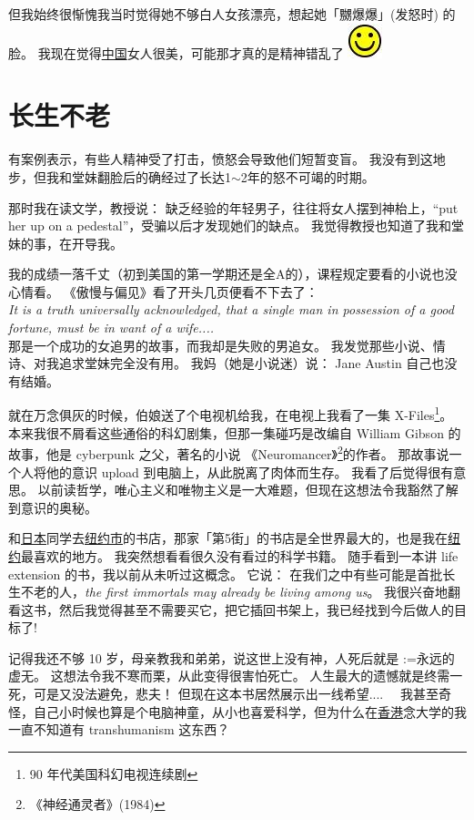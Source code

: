 \documentclass[12pt]{report}
\makeatletter
\renewcommand{\d}[1]{$\underaccent{\scalebox{0.5}{\textbullet}}{\textrm{#1}}$}
\newcommand{\ds}[1]{%
  \@tfor\next:=#1\do{\d{\next}}}
\newcommand*\smiley{\includegraphics[scale=0.5]{smiley.jpg}}
\makeatother
\begin{document}
但我始终很惭愧我当时觉得她不够白人女孩漂亮，想起她「嬲爆爆」(发怒时) 的脸。 我现在觉得\uline{中国}女人很美，可能那才真的是精神错乱了 \smiley

\chapter{长生不老}

有案例表示，有些人精神受了打击，愤怒会导致他们短暂变盲。 我没有到这地步，但我和堂妹翻脸后的确经过了长达1$\sim$2年的怒不可竭的时期。

那时我在读文学，教授说： 缺乏经验的年轻男子，往往将女人摆到神枱上，``put her up on a pedestal''，受骗以后才发现她们的缺点。  我觉得教授也知道了我和堂妹的事，在开导我。

我的成绩一落千丈（初到美国的第一学期还是全A的），课程规定要看的小说也没心情看。 《傲慢与偏见》看了开头几页便看不下去了： \\
\textit{It is a truth universally acknowledged, that a single man in possession of a good fortune, must be in want of a wife....} \\
那是一个成功的女追男的故事，而我却是失败的男追女。 我发觉那些小说、情诗、对我追求堂妹完全没有用。 我妈（她是小说迷）说： Jane Austin 自己也没有结婚。

就在万念俱灰的时候，伯娘送了个电视机给我，在电视上我看了一集 X-Files\footnote{90 年代美国科幻电视连续剧}。 本来我很不屑看这些通俗的科幻剧集，但那一集碰巧是改编自 William Gibson 的故事，他是 cyberpunk 之父，著名的小说 《Neuromancer》\footnote{《神经通灵者》(1984)}的作者。 那故事说一个人将他的意识 upload 到电脑上，从此脱离了肉体而生存。 我看了后觉得很有意思。 以前读哲学，唯心主义和唯物主义是一大难题，但现在这想法令我豁然了解到意识的奥秘。 

和\uline{日本}同学去\uline{纽约市}的书店，那家「第5街」的书店是全世界最大的，也是我在\uline{纽约}最喜欢的地方。 我突然想看看很久没有看过的科学书籍。 随手看到一本讲 life extension 的书，我以前从未听过这概念。 它说： 在我们之中有些可能是首批长生不老的人，\textit{the first immortals may already be living among us}。 我很兴奋地翻看这书，然后我觉得甚至不需要买它，把它插回书架上，我已经找到今后做人的目标了!

记得我还不够 10 岁，母亲教我和弟弟，说这世上没有神，人死后就是\ds{永远的虚无}。 这想法令我不寒而栗，从此变得很害怕死亡。 人生最大的遗憾就是终需一死，可是又没法避免，悲夫！  但现在这本书居然展示出一线希望....~~  我甚至奇怪，自己小时候也算是个电脑神童，从小也喜爱科学，但为什么在\uline{香港}念大学的我一直不知道有 transhumanism 这东西？
\end{document}
